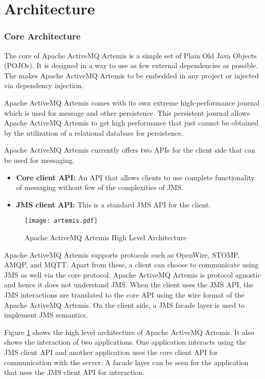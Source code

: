 \section{Architecture}

\subsubsection{Core Architecture}

The core of Apache ActiveMQ Artemis is a simple set of Plain Old Java Objects (POJOs). It is designed in a way to use as few external dependencies as possible. The makes Apache ActiveMQ Artemis to be embedded in any project or injected via dependency injection.

Apache ActiveMQ Artemis comes with its own extreme high-performance journal which is used for message and other persistence. This persistent journal allows Apache ActiveMQ Artemis to get high performance that just cannot be obtained by the utilization of a relational database for persistence.

Apache ActiveMQ Artemis currently offers two APIs for the client side that can be used for messaging.

\begin{itemize}
    \item \textbf{Core client API:}
          An API that allows clients to use complete functionality of messaging without few of the complexities of JMS.

    \item \textbf{JMS client API:}
          This is a standard JMS API for the client.

\end{itemize}

\makeatletter
\setlength{\intextsep}{20pt}
\makeatother

\begin{figure}[h!]
\centering
\texttt{[image: artemis.pdf]}
\caption{Apache ActiveMQ Artemis High Level Architecture}\label{figures:artemis}
\end{figure}

Apache ActiveMQ Artemis supports protocols such as OpenWire, STOMP, AMQP, and MQTT. Apart from these, a client can choose to communicate using JMS as well via the core protocol. Apache ActiveMQ Artemis is protocol agnostic and hence it does not understand JMS. When the client uses the JMS API, the JMS interactions are translated to the core API using the wire format of the Apache ActiveMQ Artemis. On the client side, a JMS facade layer is used to implement JMS semantics.

Figure \ref{figures:artemis} shows the high level architecture of Apache ActiveMQ Artemis. It also shows the interaction of two applications. One application interacts using the JMS client API and another application uses the core client API for communication with the server. A facade layer can be seen for the application that uses the JMS client API for interaction.